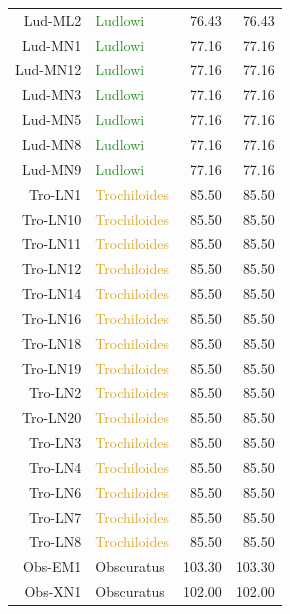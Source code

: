 \documentclass[12pt]{article}
\begin{document}
\begin{table}
\begin{tabular}{rlrr}
   Lud-ML2 & \textcolor{ForestGreen}{Ludlowi} & 76.43 & 76.43 \\ 
   Lud-MN1 & \textcolor{ForestGreen}{Ludlowi} & 77.16 & 77.16 \\ 
   Lud-MN12 & \textcolor{ForestGreen}{Ludlowi} & 77.16 & 77.16 \\ 
   Lud-MN3 & \textcolor{ForestGreen}{Ludlowi} & 77.16 & 77.16 \\ 
   Lud-MN5 & \textcolor{ForestGreen}{Ludlowi} & 77.16 & 77.16 \\ 
   Lud-MN8 & \textcolor{ForestGreen}{Ludlowi} & 77.16 & 77.16 \\ 
   Lud-MN9 & \textcolor{ForestGreen}{Ludlowi} & 77.16 & 77.16 \\ 
      \hline
   Tro-LN1 & \textcolor{Goldenrod}{Trochiloides} & 85.50 & 85.50 \\ 
   Tro-LN10 & \textcolor{Goldenrod}{Trochiloides} & 85.50 & 85.50 \\ 
   Tro-LN11 & \textcolor{Goldenrod}{Trochiloides} & 85.50 & 85.50 \\ 
   Tro-LN12 & \textcolor{Goldenrod}{Trochiloides} & 85.50 & 85.50 \\ 
   Tro-LN14 & \textcolor{Goldenrod}{Trochiloides} & 85.50 & 85.50 \\ 
   Tro-LN16 & \textcolor{Goldenrod}{Trochiloides} & 85.50 & 85.50 \\ 
   Tro-LN18 & \textcolor{Goldenrod}{Trochiloides} & 85.50 & 85.50 \\ 
   Tro-LN19 & \textcolor{Goldenrod}{Trochiloides} & 85.50 & 85.50 \\ 
   Tro-LN2 & \textcolor{Goldenrod}{Trochiloides} & 85.50 & 85.50 \\ 
   Tro-LN20 & \textcolor{Goldenrod}{Trochiloides} & 85.50 & 85.50 \\ 
   Tro-LN3 & \textcolor{Goldenrod}{Trochiloides} & 85.50 & 85.50 \\ 
   Tro-LN4 & \textcolor{Goldenrod}{Trochiloides} & 85.50 & 85.50 \\ 
   Tro-LN6 & \textcolor{Goldenrod}{Trochiloides} & 85.50 & 85.50 \\ 
   Tro-LN7 & \textcolor{Goldenrod}{Trochiloides} & 85.50 & 85.50 \\ 
   Tro-LN8 & \textcolor{Goldenrod}{Trochiloides} & 85.50 & 85.50 \\ 
      \hline
   Obs-EM1 & \textcolor{BurntOrange}{Obscuratus} & 103.30 & 103.30 \\ 
   Obs-XN1 & \textcolor{BurntOrange}{Obscuratus} & 102.00 & 102.00 \\ 

\end{tabular}
\end{table}
\end{document}

